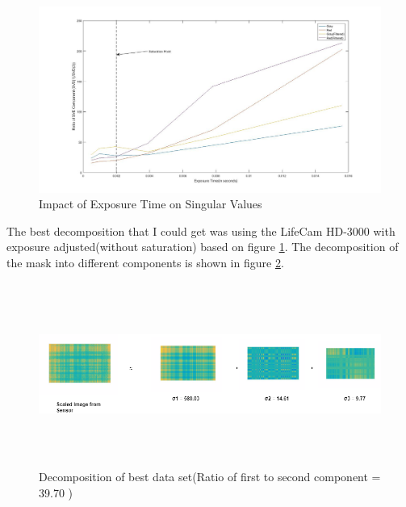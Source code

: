 \begin{figure}[h]
\centering
\includegraphics[width = \linewidth]{pics/slm/svd_graph_exposure}
\caption{Impact of Exposure Time on Singular Values}
\label{fig:svd_exposure}
\end{figure}
The best decomposition that I could get was using the LifeCam HD-3000 with exposure adjusted(without saturation) based on figure \ref{fig:svd_exposure}. The decomposition of the mask into different components is shown in figure \ref{fig:svd_dec_exp}. 
\begin{figure}[ht]
\centering
\includegraphics[width = \linewidth, height = 6cm]{pics/slm/svd-decomp-exp.png}
\caption{Decomposition of best data set(Ratio of first to second component = 39.70 )}
\label{fig:svd_dec_exp}
\end{figure}